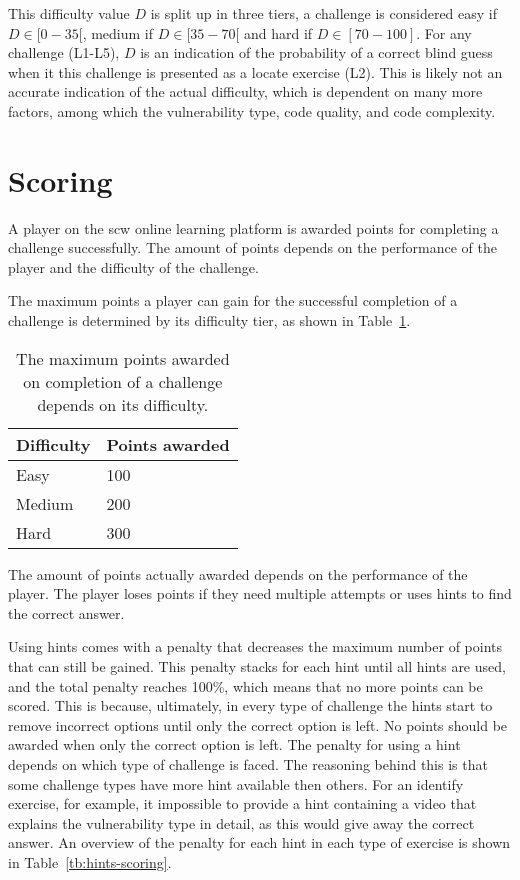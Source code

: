 This difficulty value $D$ is split up in three tiers, a challenge is considered easy if $D \in [0-35[$, medium if $D \in [35-70[$ and hard if $D \in [70-100]$. For any challenge (L1-L5), $D$ is an indication of the probability of a correct blind guess when it this challenge is presented as a locate exercise (L2). This is likely not an accurate indication of the actual difficulty, which is dependent on many more factors, among which the vulnerability type, code quality, and code complexity.

\section{Scoring}
\label{sec:scoring}
A player on the \gls{scw} online learning platform is awarded points for completing a challenge successfully. 
The amount of points depends on the performance of the player and the difficulty of the challenge.

The maximum points a player can gain for the successful completion of a challenge is determined by its difficulty tier, as shown in Table~\ref{tb:points}.

\begin{table}
\centering
\caption[Points awarded for each difficulty on the SCW platform]{The maximum points awarded on completion of a challenge depends on its difficulty.}
\begin{tabular}{ll} 
 Difficulty &  Points awarded\\
 \hline
 Easy & 100\\
 Medium & 200\\
 Hard & 300\\
\end{tabular}

\label{tb:points}
\end{table}

The amount of points actually awarded depends on the performance of the player. The player loses points if they need multiple attempts or uses hints to find the correct answer.

Using hints comes with a penalty that decreases the maximum number of points that can still be gained. This penalty stacks for each hint until all hints are used, and the total penalty reaches 100\%, which means that no more points can be scored. 
This is because, ultimately, in every type of challenge the hints start to remove incorrect options until only the correct option is left. 
No points should be awarded when only the correct option is left.
The penalty for using a hint depends on which type of challenge is faced. The reasoning behind this is that some challenge types have more hint available then others. 
For an identify exercise, for example, it impossible to provide a hint containing a video that explains the vulnerability type in detail, as this would give away the correct answer.
An overview of the penalty for each hint in each type of exercise is shown in Table~\ref{tb:hints-scoring}.


